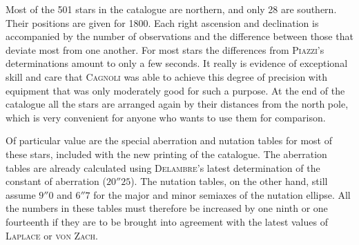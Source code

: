 Most of the 501 stars in the catalogue are northern, and only 28 are southern. Their positions are given for 1800. Each right ascension and declination is accompanied by the number of observations and the difference between those that deviate most from one another. For most stars the differences from \textsc{Piazzi}’s determinations amount to only a few seconds. It really is evidence of exceptional skill and care that \textsc{Cagnoli} was able to achieve this degree of precision with equipment that was only moderately good for such a purpose. At the end of the catalogue all the stars are arranged again by their distances from the north pole, which is very convenient for anyone who wants to use them for comparison.

Of particular value are the special aberration and nutation tables for most of these stars, included with the new printing of the catalogue. The aberration tables are already calculated using \textsc{Delambre}’s latest determination of the constant of aberration ($20''25$). The nutation tables, on the other hand, still assume $9''0$ and $6''7$ for the major and minor semiaxes of the nutation ellipse. All the numbers in these tables must therefore be increased by one ninth or one fourteenth if they are to be brought into agreement with the latest values of \textsc{Laplace} or \textsc{von Zach}.

